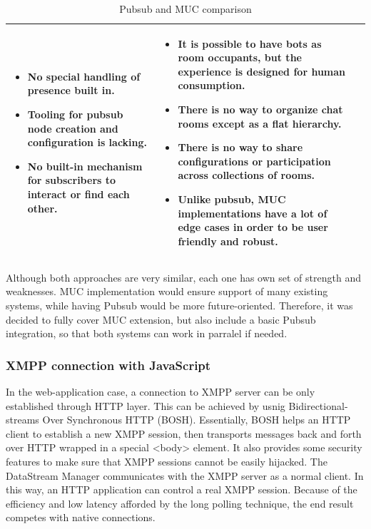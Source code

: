 \begin{table}[H]
\begin{tabular}{|L{0.5cm}|L{7.5cm}|L{7.5cm}|}
\begin{itemize}
		\item No special handling of presence built in. 
		\item Tooling for pubsub node creation and configuration is lacking. 
		\item No built-in mechanism for subscribers to interact or find each other. 
		\end{itemize}
	& \begin{itemize}
		\item It is possible to have bots as room occupants, but the experience is designed for human consumption. 
		\item There is no way to organize chat rooms except as a flat hierarchy.
		\item There is no way to share configurations or participation across collections of rooms.
		\item Unlike pubsub, MUC implementations have a lot of edge cases in order to be user friendly and robust.
		\end{itemize}\\
	\hline
	\hline
	\end{tabular}
	\caption[Pubsub and MUC comparison]{Pubsub and MUC comparison}
	\label{tab:muc_vs_pubsub}
	\end{table}

Although both approaches are very similar, each one has own set of strength and weaknesses. MUC implementation would ensure support of many existing systems, while having Pubsub would be more future-oriented. Therefore, it was decided to fully cover MUC extension, but also include a basic Pubsub integration, so that both systems can work in parralel if needed.

\subsubsection{XMPP connection with JavaScript}
In the web-application case, a connection to XMPP server can be only established through HTTP layer. This can be achieved by usnig Bidirectional-streams Over Synchronous HTTP (BOSH). Essentially, BOSH helps an HTTP client to establish a new XMPP session, then transports messages back and forth over HTTP wrapped in a special <body> element. It also provides some security features to make sure that XMPP sessions cannot be easily hijacked. The DataStream Manager communicates with the XMPP server as a normal client. In this way, an HTTP application can control a real XMPP session. Because of the efficiency and low latency afforded by the long polling technique, the end result competes with native connections.

